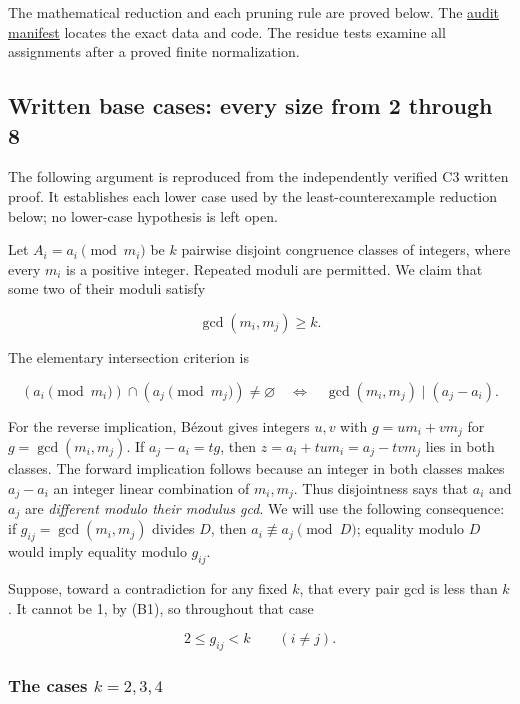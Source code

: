 \documentclass[11pt,a4paper]{article}
\begin{document}
The mathematical reduction and each pruning rule are proved below. The \href{https://github.com/mpelteshki/climbing-to-the-frontier/blob/212bba53b1818c08c40b8c4b48f636651eaf6410/cagent/p4/audit/MANIFEST.md}{audit manifest} locates the exact data and code. The residue tests examine all assignments after a proved finite normalization.

\subsection{Written base cases: every size from 2 through 8}\label{written-base-cases-every-size-from-2-through-8}

The following argument is reproduced from the independently verified C3 written proof. It establishes each lower case used by the least-counterexample reduction below; no lower-case hypothesis is left open.

Let \(A_i=a_i\pmod{m_i}\) be \(k\) pairwise disjoint congruence classes of integers, where every \(m_i\) is a positive integer. Repeated moduli are permitted. We claim that some two of their moduli satisfy

\[
\gcd(m_i,m_j)\ge k.
\]

The elementary intersection criterion is

\[
(a_i\pmod{m_i})\cap(a_j\pmod{m_j})\ne\varnothing
\quad\Longleftrightarrow\quad
\gcd(m_i,m_j)\mid(a_j-a_i).
\tag{B1}
\]

For the reverse implication, B\'{e}zout gives integers \(u,v\) with \(g=u m_i+v m_j\) for \(g=\gcd(m_i,m_j)\). If \(a_j-a_i=tg\), then \(z=a_i+tum_i=a_j-tvm_j\) lies in both classes. The forward implication follows because an integer in both classes makes \(a_j-a_i\) an integer linear combination of \(m_i,m_j\). Thus disjointness says that \(a_i\) and \(a_j\) are \emph{different modulo their modulus gcd}. We will use the following consequence: if \(g_{ij}=\gcd(m_i,m_j)\) divides \(D\), then \(a_i\not\equiv a_j\pmod D\); equality modulo \(D\) would imply equality modulo \(g_{ij}\).

Suppose, toward a contradiction for any fixed \(k\), that every pair gcd is less than \(k\). It cannot be 1, by (B1), so throughout that case

\[
2\le g_{ij}<k\qquad(i\ne j).
\tag{B2}
\]

\subsubsection{\texorpdfstring{The cases \(k=2,3,4\)}{The cases k=2,3,4}}\label{the-cases-k234}
\end{document}
